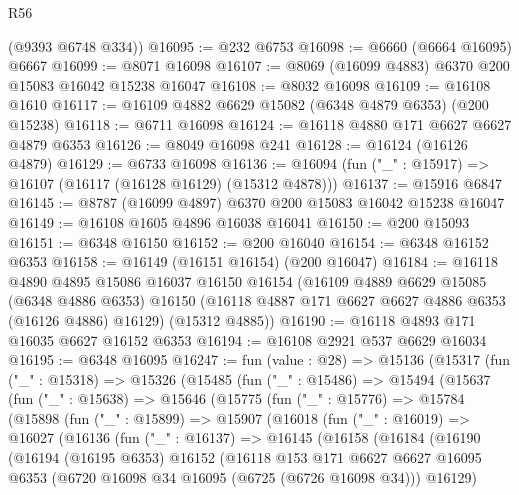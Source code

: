 \begin{lexlean}{R56}
\begin{coremodule}
      (@9393 @6748 @334))
@16095 := @232 @6753
@16098 := @6660 (@6664 @16095) @6667
@16099 := @8071 @16098
@16107 := @8069 (@16099 @4883) @6370 @200 @15083 @16042 @15238 @16047
@16108 := @8032 @16098
@16109 := @16108 @1610
@16117 := @16109 @4882 @6629 @15082 (@6348 @4879 @6353) (@200 @15238)
@16118 := @6711 @16098
@16124 := @16118 @4880 @171 @6627 @6627 @4879 @6353
@16126 := @8049 @16098 @241
@16128 := @16124 (@16126 @4879)
@16129 := @6733 @16098
@16136 := @16094 (fun ("_" : @15917) => @16107 (@16117 (@16128 @16129) (@15312 @4878)))
@16137 := @15916 @6847
@16145 := @8787 (@16099 @4897) @6370 @200 @15083 @16042 @15238 @16047
@16149 := @16108 @1605 @4896 @16038 @16041
@16150 := @200 @15093
@16151 := @6348 @16150
@16152 := @200 @16040
@16154 := @6348 @16152 @6353
@16158 := @16149 (@16151 @16154) (@200 @16047)
@16184 := @16118
    @4890
    @4895
    @15086
    @16037
    @16150
    @16154
    (@16109
      @4889
      @6629
      @15085
      (@6348 @4886 @6353)
      @16150
      (@16118 @4887 @171 @6627 @6627 @4886 @6353 (@16126 @4886) @16129)
      (@15312 @4885))
@16190 := @16118 @4893 @171 @16035 @6627 @16152 @6353
@16194 := @16108 @2921 @537 @6629 @16034
@16195 := @6348 @16095
@16247 := fun (value : @28) =>
  @15136
    (@15317
      (fun ("_" : @15318) =>
      @15326
        (@15485
          (fun ("_" : @15486) =>
          @15494
            (@15637
              (fun ("_" : @15638) =>
              @15646
                (@15775
                  (fun ("_" : @15776) =>
                  @15784
                    (@15898
                      (fun ("_" : @15899) =>
                      @15907
                        (@16018
                          (fun ("_" : @16019) =>
                          @16027
                            (@16136
                              (fun ("_" : @16137) =>
                              @16145
                                (@16158
                                  (@16184
                                    (@16190
                                      (@16194
                                        (@16195 @6353)
                                        @16152
                                        (@16118
                                          @153
                                          @171
                                          @6627
                                          @6627
                                          @16095
                                          @6353
                                          (@6720 @16098 @34 @16095 (@6725 (@6726 @16098 @34)))
                                          @16129)

\end{coremodule}
\end{lexlean}
